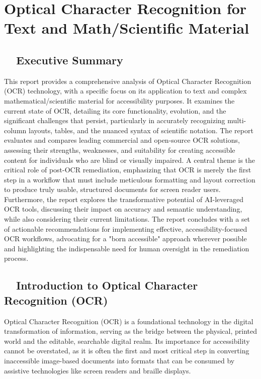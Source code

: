 \chapter{Optical Character Recognition for Text and Math/Scientific Material}
\label{chap:ocr-report}


\section{~~Executive Summary}
\label{sec:ocr-executive-summary}
This report provides a comprehensive analysis of Optical Character Recognition (OCR) technology, with a specific focus on its application to text and complex mathematical/scientific material for accessibility purposes. It examines the current state of OCR, detailing its core functionality, evolution, and the significant challenges that persist, particularly in accurately recognizing multi-column layouts, tables, and the nuanced syntax of scientific notation. The report evaluates and compares leading commercial and open-source OCR solutions, assessing their strengths, weaknesses, and suitability for creating accessible content for individuals who are blind or visually impaired. A central theme is the critical role of post-OCR remediation, emphasizing that OCR is merely the first step in a workflow that must include meticulous formatting and layout correction to produce truly usable, structured documents for screen reader users. Furthermore, the report explores the transformative potential of AI-leveraged OCR tools, discussing their impact on accuracy and semantic understanding, while also considering their current limitations. The report concludes with a set of actionable recommendations for implementing effective, accessibility-focused OCR workflows, advocating for a "born accessible" approach wherever possible and highlighting the indispensable need for human oversight in the remediation process.

\section{~~Introduction to Optical Character Recognition (OCR)}
\label{sec:intro-to-ocr}
Optical Character Recognition (OCR) is a foundational technology in the digital transformation of information, serving as the bridge between the physical, printed world and the editable, searchable digital realm. Its importance for accessibility cannot be overstated, as it is often the first and most critical step in converting inaccessible image-based documents into formats that can be consumed by assistive technologies like screen readers and braille displays.

